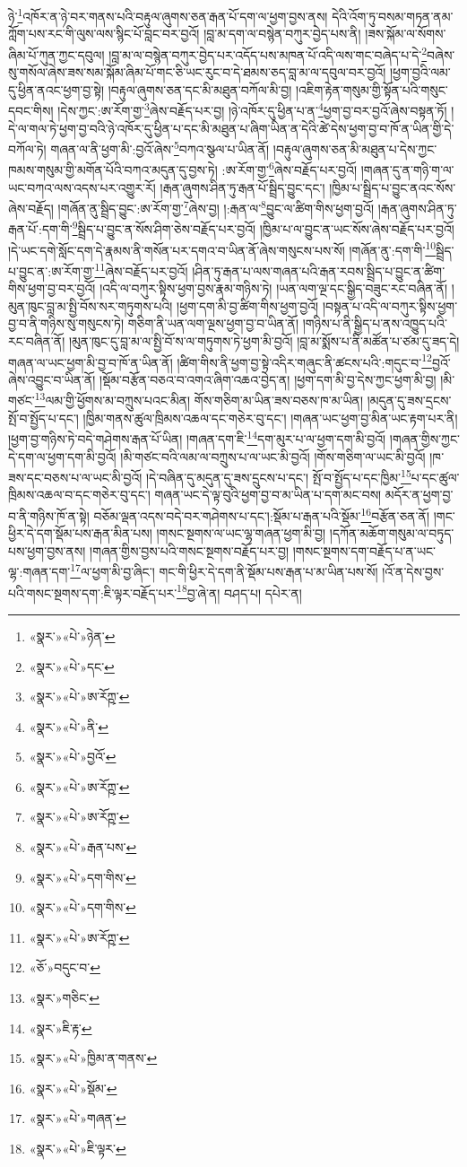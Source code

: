 ཉེ་\footnote{«སྣར་»«པེ་»ཉེན་}འཁོར་ན་ཉེ་བར་གནས་པའི་བརྟུལ་ཞུགས་ཅན་རྒན་པོ་དག་ལ་ཕྱག་བྱས་ནས། དེའི་འོག་ཏུ་བསམ་གཏན་ནམ་ཀློག་པས་རང་གི་ལུས་ལས་སྙིང་པོ་བླང་བར་བྱའོ། །བླ་མ་དག་ལ་བསྙེན་བཀུར་བྱེད་པས་ནི། །ཟས་སྐོམ་ལ་སོགས་ཞིམ་པོ་ཀུན་ཀྱང་དབུལ། །བླ་མ་ལ་བསྙེན་བཀུར་བྱེད་པར་འདོད་པས་མཁན་པོ་འདི་ལས་གང་བཞེད་པ་དེ་\footnote{«སྣར་»«པེ་»དང་}བཞེས་སུ་གསོལ་ཞེས་ཟས་སམ་སྐོམ་ཞིམ་པོ་གང་ཅི་ཡང་རུང་བ་དེ་ཐམས་ཅད་བླ་མ་ལ་དབུལ་བར་བྱའོ། །ཕྱག་བྱའི་ལམ་དུ་ཕྱིན་ནའང་ཕྱག་བྱ་སྟེ། །བརྟུལ་ཞུགས་ཅན་དང་མི་མཐུན་བཀོལ་མི་བྱ། །འཇིག་རྟེན་གསུམ་གྱི་སྟོན་པའི་གསུང་དབང་གིས། །དེས་ཀྱང་:ཨ་རོག་གྱ་\footnote{«སྣར་»«པེ་»ཨ་རོཀྵ་}ཞེས་བརྗོད་པར་བྱ། །ཉེ་འཁོར་དུ་ཕྱིན་པ་ན་\footnote{«སྣར་»«པེ་»ནི་}ཕྱག་བྱ་བར་བྱའོ་ཞེས་བསྟན་ཏོ། །དེ་ལ་གལ་ཏེ་ཕྱག་བྱ་བའི་ཉེ་འཁོར་དུ་ཕྱིན་པ་དང་མི་མཐུན་པ་ཞིག་ཡིན་ན་དེའི་ཚེ་དེས་ཕྱག་བྱ་བ་ཁོ་ན་ཡིན་གྱི་དེ་བཀོལ་ཏེ། གཞན་ལ་ནི་ཕྱག་མི་:བྱའོ་ཞེས་\footnote{«སྣར་»«པེ་»བྱའོ་}བཀའ་སྩལ་པ་ཡིན་ནོ། །བརྟུལ་ཞུགས་ཅན་མི་མཐུན་པ་དེས་ཀྱང་ཁམས་གསུམ་གྱི་མགོན་པོའི་བཀའ་མདུན་དུ་བྱས་ཏེ། :ཨ་རོག་གྱ་\footnote{«སྣར་»«པེ་»ཨ་རོཀྵ་}ཞེས་བརྗོད་པར་བྱའོ། །གཞན་དུ་ན་གཉི་ག་ལ་ཡང་བཀའ་ལས་འདས་པར་འགྱུར་རོ། །རྒན་ཞུགས་ཤིན་ཏུ་རྒན་པོ་སྦྲིད་བྱུང་དང་། །ཁྱིམ་པ་སྦྲིད་པ་བྱུང་ནའང་སོས་ཞེས་བརྗོད། །གཞོན་ནུ་སྦྲིད་བྱུང་:ཨ་རོག་གྱ་\footnote{«སྣར་»«པེ་»ཨ་རོཀྵ་}ཞེས་བྱ། །:རྒན་ལ་\footnote{«སྣར་»«པེ་»རྒན་པས་}བྱུང་ལ་ཚིག་གིས་ཕྱག་བྱའོ། །རྒན་ཞུགས་ཤིན་ཏུ་རྒན་པོ་:དག་གི་\footnote{«སྣར་»«པེ་»དག་གིས་}སྦྲིད་པ་བྱུང་ན་སོས་ཤིག་ཅེས་བརྗོད་པར་བྱའོ། །ཁྱིམ་པ་ལ་བྱུང་ན་ཡང་སོས་ཞེས་བརྗོད་པར་བྱའོ། །དེ་ཡང་དགེ་སློང་དག་དེ་རྣམས་ནི་གསོན་པར་དགའ་བ་ཡིན་ནོ་ཞེས་གསུངས་པས་སོ། །གཞོན་ནུ་:དག་གི་\footnote{«སྣར་»«པེ་»དག་གིས་}སྦྲིད་པ་བྱུང་ན་:ཨ་རོག་གྱ་\footnote{«སྣར་»«པེ་»ཨ་རོཀྵ་}ཞེས་བརྗོད་པར་བྱའོ། །ཤིན་ཏུ་རྒན་པ་ལས་གཞན་པའི་རྒན་རབས་སྦྲིད་པ་བྱུང་ན་ཚིག་གིས་ཕྱག་བྱ་བར་བྱའོ། །འདི་ལ་བཀུར་སྟིས་ཕྱག་བྱས་རྣམ་གཉིས་ཏེ། །ཡན་ལག་ལྔ་དང་སྒྱིད་བཟུང་རང་བཞིན་ནོ། །མུན་ཁུང་བླ་མ་སྤྱི་བོས་སར་གཏུགས་པའི། །ཕྱག་དག་མི་བྱ་ཚིག་གིས་ཕྱག་བྱའོ། །བསྟན་པ་འདི་ལ་བཀུར་སྟིས་ཕྱག་བྱ་བ་ནི་གཉིས་སུ་གསུངས་ཏེ། གཅིག་ནི་ཡན་ལག་ལྔས་ཕྱག་བྱ་བ་ཡིན་ནོ། །གཉིས་པ་ནི་སྒྱིད་པ་ནས་འཁྱུད་པའི་རང་བཞིན་ནོ། །མུན་ཁུང་དུ་བླ་མ་ལ་སྤྱི་བོ་ས་ལ་གཏུགས་ཏེ་ཕྱག་མི་བྱའོ། །བླ་མ་སྨོས་པ་ནི་མཚོན་པ་ཙམ་དུ་ཟད་དེ། གཞན་ལ་ཡང་ཕྱག་མི་བྱ་བ་ཁོ་ན་ཡིན་ནོ། །ཚིག་གིས་ནི་ཕྱག་བྱ་སྟེ་འདིར་གཞུང་ནི་ཚངས་པའི་:གདུང་བ་\footnote{«ཅོ་»བདུང་བ་}བྱའོ་ཞེས་འབྱུང་བ་ཡིན་ནོ། །སྡོམ་བརྩོན་བཅའ་བ་འགའ་ཞིག་འཆའ་བྱེད་ན། །ཕྱག་དག་མི་བྱ་དེས་ཀྱང་ཕྱག་མི་བྱ། །མི་གཙང་\footnote{«སྣར་»གཅིང་}ལམ་གྱི་ཕྱོགས་མ་བཀྲུས་པའང་མིན། གོས་གཅིག་མ་ཡིན་ཟས་བཅས་ཁ་མ་ཡིན། །མདུན་དུ་ཟས་དྲངས་སྤོ་བ་སྤྱོད་པ་དང་། །ཁྱིམ་གནས་ཚུལ་ཁྲིམས་འཆལ་དང་གཅེར་བུ་དང་། །གཞན་ཡང་ཕྱག་བྱ་མིན་ཡང་རྟག་པར་ནི། །ཕྱག་བྱ་གཉིས་ཏེ་བདེ་གཤེགས་རྒན་པོ་ཡིན། །གཞན་དག་ཇི་\footnote{«སྣར་»ཇི་རྟ་}དག་མུར་པ་ལ་ཕྱག་དག་མི་བྱའོ། །གཞན་གྱིས་ཀྱང་དེ་དག་ལ་ཕྱག་དག་མི་བྱའོ། །མི་གཙང་བའི་ལམ་ལ་བཀྲུས་པ་ལ་ཡང་མི་བྱའོ། །གོས་གཅིག་ལ་ཡང་མི་བྱའོ། །ཁ་ཟས་དང་བཅས་པ་ལ་ཡང་མི་བྱའོ། །དེ་བཞིན་དུ་མདུན་དུ་ཟས་དྲུངས་པ་དང་། སྤོ་བ་སྤྱོད་པ་དང་ཁྱིམ་\footnote{«སྣར་»«པེ་»ཁྱིམ་ན་གནས་}པ་དང་ཚུལ་ཁྲིམས་འཆལ་བ་དང་གཅེར་བུ་དང་། གཞན་ཡང་དེ་ལྟ་བུའི་ཕྱག་བྱ་བ་མ་ཡིན་པ་དག་མང་བས། མདོར་ན་ཕྱག་བྱ་བ་ནི་གཉིས་ཁོ་ན་སྟེ། བཅོམ་ལྡན་འདས་བདེ་བར་གཤེགས་པ་དང་།:སྡོམ་པ་རྒན་པའི་སྡོམ་\footnote{«སྣར་»«པེ་»སྡོམ་}བརྩོན་ཅན་ནོ། །གང་ཕྱིར་དེ་དག་སྡོམ་པས་རྒན་མིན་པས། །གསང་སྔགས་ལ་ཡང་ལྷ་གཞན་ཕྱག་མི་བྱ། །དཀོན་མཆོག་གསུམ་ལ་བཏུད་པས་ཕྱག་བྱས་ནས། །གཞན་གྱིས་བྱས་པའི་གསང་སྔགས་བརྗོད་པར་བྱ། །གསང་སྔགས་དག་བརྗོད་པ་ན་ཡང་ལྷ་:གཞན་དག་\footnote{«སྣར་»«པེ་»གཞན་}ལ་ཕྱག་མི་བྱ་ཞིང་། གང་གི་ཕྱིར་དེ་དག་ནི་སྡོམ་པས་རྒན་པ་མ་ཡིན་པས་སོ། །འོ་ན་དེས་བྱས་པའི་གསང་སྔགས་དག་:ཇི་ལྟར་བརྗོད་པར་\footnote{«སྣར་»«པེ་»ཇི་ལྟར་}བྱ་ཞེ་ན། བཤད་པ། དཔེར་ན། 